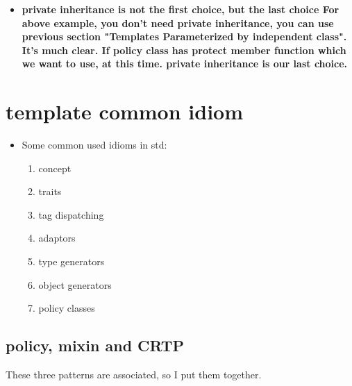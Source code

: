 \documentclass[a4paper,11pt,twoside]{book}
\begin{document}
\begin{itemize}
\item \textbf{private inheritance is not the first choice, but the last choice For above example, you don't need private inheritance, you can use previous section "Templates Parameterized by independent class". It's much clear. If policy class has protect member function which we want to use, at this time. private inheritance is our last choice. }
\end{itemize}



\section{template common idiom}
\begin{itemize}
	\item Some common used idioms in std:
	\begin{enumerate}
		\item concept
		\item traits
		\item tag dispatching
		\item adaptors
		\item type generators
		\item object generators
		\item policy classes
	\end{enumerate}

	
\end{itemize}

\subsection{policy, mixin and CRTP}
These three patterns are associated, so I put them together. 
\end{document}
